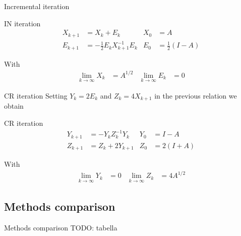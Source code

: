 \documentclass{beamer}
\theoremstyle{plain}
\theoremstyle{definition}
\theoremstyle{remark}
\newcommand{\pa}[1]{\left(#1\right)}
\begin{document}
\begin{frame}{Incremental iteration}
  \begin{block}{IN iteration}
    \begin{align*}
      X_{k+1} &= X_k + E_k & X_0 &= A \\
      E_{k+1} &= -\frac{1}{2} E_k X_{k+1}^{-1} E_k & E_0
                                 &=\frac{1}{2}\pa{I-A}
    \end{align*}
  \end{block}
  With 
  \begin{align*}
    \lim _{k\to \infty} X_k & = A^{1/2} & \lim _{k\to \infty} E_k &=0
  \end{align*}
\end{frame}

\begin{frame}{CR iteration}
  Setting $Y_k = 2E_k$ and $Z_k = 4X_{k+1}$ in the previous relation
  we obtain
  \begin{block}{CR iteration}
    \begin{align*}
      Y_{k+1} &= -Y_kZ_k^{-1}Y_k & Y_0 &= I -A \\
      Z_{k+1} &= Z_k + 2Y_{k+1} & Z_0 &= 2(I+A)
    \end{align*}
  \end{block}
  With 
  \begin{align*}
    \lim _{k\to \infty} Y_k & = 0 & \lim _{k\to \infty} Z_k &=
                                                              4A^{1/2}
  \end{align*}
\end{frame}

\subsection{Methods comparison}

\begin{frame}{Methods comparison}
  TODO: tabella
\end{frame}
\end{document}
